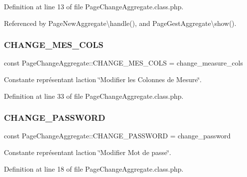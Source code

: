 Definition at line 13 of file Page\+Change\+Aggregate.\+class.\+php.



Referenced by Page\+New\+Aggregate\textbackslash{}handle(), and Page\+Gest\+Aggregate\textbackslash{}show().

\mbox{\label{class_page_change_aggregate_ab34fb39084f70b5581037b3a59d15a4a}} 
\subsubsection{\texorpdfstring{C\+H\+A\+N\+G\+E\+\_\+\+M\+E\+S\+\_\+\+C\+O\+LS}{CHANGE\_MES\_COLS}}
{\footnotesize\ttfamily const Page\+Change\+Aggregate\+::\+C\+H\+A\+N\+G\+E\+\_\+\+M\+E\+S\+\_\+\+C\+O\+LS = \textquotesingle{}change\+\_\+measure\+\_\+cols\textquotesingle{}}

Constante représentant l\textquotesingle{}action \char`\"{}\+Modifier les Colonnes de Mesure\char`\"{}. 

Definition at line 33 of file Page\+Change\+Aggregate.\+class.\+php.

\mbox{\label{class_page_change_aggregate_ab004bbd3e82290f0f37c547438719b3b}} 
\subsubsection{\texorpdfstring{C\+H\+A\+N\+G\+E\+\_\+\+P\+A\+S\+S\+W\+O\+RD}{CHANGE\_PASSWORD}}
{\footnotesize\ttfamily const Page\+Change\+Aggregate\+::\+C\+H\+A\+N\+G\+E\+\_\+\+P\+A\+S\+S\+W\+O\+RD = \textquotesingle{}change\+\_\+password\textquotesingle{}}

Constante représentant l\textquotesingle{}action \char`\"{}\+Modifier Mot de passe\char`\"{}. 

Definition at line 18 of file Page\+Change\+Aggregate.\+class.\+php.

